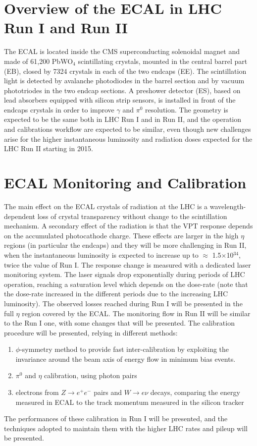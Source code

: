 \documentclass[11pt,twocolumn]{article}
\begin{document}
\section{Overview of the ECAL in LHC Run I and Run II}
The ECAL is located inside the CMS superconducting solenoidal magnet
and made of 61,200 PbWO$_4$ scintillating crystals, mounted in the
central barrel part (EB), closed by 7324 crystals in each of the two
endcaps (EE). The scintillation light is detected by avalanche
photodiodes in the barrel section and by vacuum phototriodes in the
two endcap sections. A preshower detector (ES), based on lead
absorbers equipped with silicon strip sensors, is installed in front
of the endcaps crystals in order to improve $\gamma$ and $\pi^0$
resolution. The geometry is expected to be the same both in LHC Run I
and in Run II, and the operation and calibrations workflow are
expected to be similar, even though new challenges arise for the
higher instantaneous luminosity and radiation doses expected for the
LHC Run II starting in 2015.

\section{ECAL Monitoring and Calibration}


The main effect on the ECAL crystals of radiation at the LHC is a
wavelength-dependent loss of crystal transparency without change to
the scintillation mechanism.  A secondary effect of the radiation is
that the VPT response depends on the accumulated photocathode charge.
These effects are larger in the high $\eta$ regions (in particular the
endcaps) and they will be more challenging in Run II, when the
instantaneous luminosity is expected to increase up to $\approx$
1.5$\times$10$^{34}$, twice the value of Run I. The response change is
measured with a dedicated laser monitoring system. The laser signals
drop exponentially during periods of LHC operation, reaching a
saturation level which depends on the dose-rate (note that the
dose-rate increased in the different periods due to the increasing LHC
luminosity). The observed losses reached during Run I will be
presented in the full $\eta$ region covered by the ECAL. The
monitoring flow in Run II will be similar to the Run I one, with some
changes that will be presented.  The calibration procedure will be
presented, relying in different methods: 
\begin{enumerate}
\item $\phi$-symmetry method to provide fast inter-calibration by
  exploiting the invariance around the beam axis of energy flow in
  minimum bias events.
\item $\pi^0$ and $\eta$ calibration, using photon pairs
\item electrons from $Z\to e^+e^-$ pairs and $W\to e\nu$ decays,
  comparing the energy measured in ECAL to the track momentum measured
  in the silicon tracker
\end{enumerate}
The performances of these calibration in Run I will be presented, and
the techniques adopted to maintain them with the higher LHC rates and
pileup will be presented.
\end{document}
